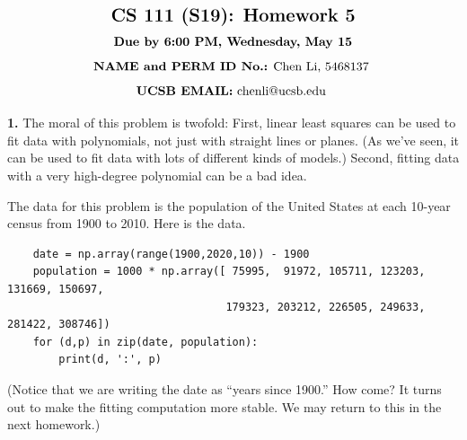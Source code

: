 \documentclass[11pt]{article}
\begin{document}
$$\mbox{\Large \textbf {CS 111 (S19): Homework 5}}$$
$$\mbox{\textbf {Due by 6:00 PM, Wednesday, May 15}}$$
$$\mbox{\textbf {NAME and PERM ID No.:} Chen Li, 5468137 }$$
$$\mbox{\textbf {UCSB EMAIL:} chenli@ucsb.edu }$$

\par\bigskip
{\bf 1.}
The moral of this problem is twofold: 
First, linear least squares can be used to fit data with polynomials,
not just with straight lines or planes.
(As we've seen, it can be used to fit data with lots of different kinds of models.)
Second, fitting data with a very high-degree polynomial can be a bad idea.

The data for this problem is the population of the United States at each
10-year census from 1900 to 2010. Here is the data.
\begin{verbatim}
    date = np.array(range(1900,2020,10)) - 1900
    population = 1000 * np.array([ 75995,  91972, 105711, 123203, 131669, 150697, 
                                  179323, 203212, 226505, 249633, 281422, 308746])
    for (d,p) in zip(date, population):
        print(d, ':', p)
\end{verbatim}
(Notice that we are writing the date as ``years since 1900.''
How come?
It turns out to make the fitting computation more stable.
We may return to this in the next homework.)
\end{document}
